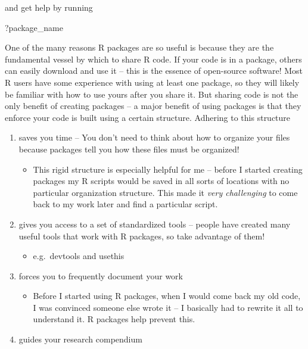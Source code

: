\documentclass[
]{book}
\newenvironment{Shaded}{\begin{snugshade}}{\end{snugshade}}
\newcommand{\NormalTok}[1]{#1}
\providecommand{\tightlist}{%
  \setlength{\itemsep}{0pt}\setlength{\parskip}{0pt}}
\begin{document}
and get help by running

\begin{Shaded}
\begin{Highlighting}[]
\NormalTok{?package_name}
\end{Highlighting}
\end{Shaded}

One of the many reasons R packages are so useful is because they are the fundamental vessel by which to share R code. If your code is in a package, others can easily download and use it -- this is the essence of open-source software! Most R users have some experience with using at least one package, so they will likely be familiar with how to use yours after you share it. But sharing code is not the only benefit of creating packages -- a major benefit of using packages is that they enforce your code is built using a certain structure. Adhering to this structure

\begin{enumerate}
\def\labelenumi{\arabic{enumi}.}
\tightlist
\item
  saves you time -- You don't need to think about how to organize your files because packages tell you how these files must be organized!

  \begin{itemize}
  \tightlist
  \item
    This rigid structure is especially helpful for me -- before I started creating packages my R scripts would be saved in all sorts of locations with no particular organization structure. This made it \emph{very challenging} to come back to my work later and find a particular script.
  \end{itemize}
\item
  gives you access to a set of standardized tools -- people have created many useful tools that work with R packages, so take advantage of them!

  \begin{itemize}
  \tightlist
  \item
    e.g.~devtools and usethis
  \end{itemize}
\item
  forces you to frequently document your work

  \begin{itemize}
  \tightlist
  \item
    Before I started using R packages, when I would come back my old code, I was convinced someone else wrote it -- I basically had to rewrite it all to understand it. R packages help prevent this.
  \end{itemize}
\item
  guides your research compendium
\end{enumerate}
\end{document}
